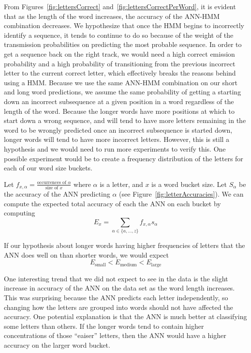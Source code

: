 \documentclass[11pt,letterpaper]{article}
\begin{document}
From Figures~\ref{fig:lettersCorrect} and~\ref{fig:lettersCorrectPerWord}, it is evident that as the length of the word increases, the accuracy of the
ANN-HMM combination decreases. We hypothesize that once the HMM begins to incorrectly identify a
sequence, it tends to continue to do so because of the weight of the transmission probabilities on
predicting the most probable sequence. In order to get a sequence back on the right track, we would
need a high correct emission probability and a high probability of transitioning from the previous
incorrect letter to the current correct letter, which effectively breaks the reasons behind using a
HMM\@. Because we use the same ANN-HMM combination on our short and long word predictions, we assume
the same probability of getting a starting down an incorrect subsequence at a given position in a
word regardless of the length of the word. Because the longer words have more positions at which to
start down a wrong sequence, and will tend to have more letters remaining in the word to be wrongly
predicted once an incorrect subsequence is started down, longer words will tend to have more
incorrect letters. However, this is still a hypothesis and we would need to run more
experiments to verify this. One possible experiment would be to create a frequency distribution of the letters for each of our word size buckets.

Let $f_{x,\alpha}=\frac{\textrm{occurrences of }\alpha}{\textrm{size of }x}$
where $\alpha$ is a letter, and $x$ is a word bucket size. Let $S_\alpha$ be
the accuracy of the ANN predicting $\alpha$ (see Figure~\ref{fig:letterAccuracies}). We can compute the
expected total accuracy of each the ANN on each bucket by computing
\begin{equation}
E_x = \sum_{\alpha \in \{a,\ldots, z\}}f_{x,\alpha} s_\alpha
\end{equation}

If our hypothesis about longer words having higher frequencies of letters that the ANN does well on than shorter words, we would expect 
\begin{equation*}
E_{\textrm{small}} < E_{\textrm{medium}} < E_{\textrm{large}}
\end{equation*}


One interesting trend that we did not expect to see in the data is the slight increase in accuracy
of the ANN on the data set as the word length increases. This was surprising because the ANN
predicts each letter independently, so changing how the letters are grouped into words should not
have affected the accuracy. One potential explanation is that the ANN is much better at classifying
some letters than others. If the longer words tend to contain higher concentrations of those
``eaiser'' letters, then the ANN would have a higher accuracy on the larger word bucket. 
\end{document}
